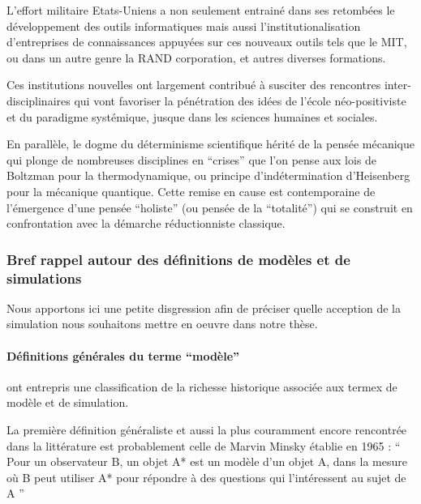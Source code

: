 L'effort militaire Etats-Uniens a non seulement entrainé dans ses retombées le développement des outils informatiques mais aussi l'institutionalisation d'entreprises de connaissances appuyées sur ces nouveaux outils tels que le MIT, ou dans un autre genre la RAND corporation, et autres diverses formations.

Ces institutions nouvelles ont largement contribué à susciter des rencontres inter-disciplinaires qui vont favoriser la pénétration des idées de l'école néo-positiviste et du paradigme systémique, jusque dans les sciences humaines et sociales.

En parallèle, le dogme du déterminisme scientifique hérité de la pensée mécanique qui plonge de nombreuses disciplines en \enquote{crises} \autocite[20-23]{Pouvreau2013} que l'on pense aux lois de Boltzman pour la thermodynamique, ou principe d’indétermination d'Heisenberg pour la mécanique quantique. Cette remise en cause est contemporaine de l'émergence d'une pensée \enquote{holiste} (ou pensée de la \enquote{totalité}) qui se construit en confrontation avec la démarche réductionniste classique.


\subsubsection{Bref rappel autour des définitions de modèles et de simulations}
\label{ssec:rapell_termes_generiques}

Nous apportons ici une petite disgression afin de préciser quelle acception de la simulation nous souhaitons mettre en oeuvre dans notre thèse.

\paragraph{Définitions générales du terme \enquote{modèle}}

\textcite{Varenne2013} ont entrepris une classification de la richesse historique associée aux termex de modèle et de simulation.

La première définition généraliste et aussi la plus couramment encore rencontrée dans la littérature est probablement celle de Marvin Minsky établie en 1965 \autocite{Varenne2008} \autocite[15]{Varenne2013}  : \enquote{ Pour un observateur B, un objet A* est un modèle d’un objet A, dans la mesure où B peut utiliser A* pour répondre à des questions qui l’intéressent au sujet de A } \autocite{Minsky1965}

